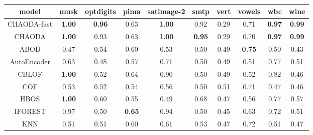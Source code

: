 \begin{table*}[!t]
\begin{center}
\begin{small}
\begin{sc}
\begin{tabular}{|c|c|c|c|c|c|c|c|c|c|}
\hline
\textbf{model} & \textbf{musk} & \textbf{optdigits} & \textbf{pima} & \textbf{satimage-2} & \textbf{smtp} & \textbf{vert} & \textbf{vowels} &  \textbf{wbc} & \textbf{wine} \\
\hline
        CHAODA-fast & \textbf{1.00} &      \textbf{0.96} &          0.63 &       \textbf{1.00} &          0.92 &               0.29 &            0.71 & \textbf{0.97} & \textbf{0.99} \\
\hline
        CHAODA & \textbf{1.00} &               0.93 &          0.63 &       \textbf{1.00} & \textbf{0.95} &               0.29 &            0.70 & \textbf{0.97} & \textbf{0.99} \\
\hline
                ABOD &          0.47 &               0.54 &          0.60 &                0.53 &          0.50 &               0.49 &   \textbf{0.75} &          0.50 &          0.43 \\
\hline
        AutoEncoder &          0.63 &               0.48 &          0.57 &                0.71 &          0.50 &               0.49 &            0.51 &          0.77 &          0.51 \\
\hline
                CBLOF & \textbf{1.00} &               0.52 &          0.64 &                0.90 &          0.50 &               0.49 &            0.52 &          0.82 &          0.46 \\
\hline
                COF &          0.53 &               0.52 &          0.54 &                0.56 &          0.50 &               0.51 &            0.71 &          0.47 &          0.46 \\
\hline
                HBOS & \textbf{1.00} &               0.60 &          0.55 &                0.49 &          0.68 &               0.47 &            0.56 &          0.77 &          0.57 \\
\hline
        IFOREST &          0.97 &               0.50 & \textbf{0.65} &                0.94 &          0.50 &               0.45 &            0.63 &          0.72 &          0.51 \\
\hline
                KNN &          0.51 &               0.51 &          0.60 &                0.61 &          0.53 &               0.47 &            0.72 &          0.51 &          0.47 \\

\end{tabular}
\end{sc}
\end{small}
\end{center}
\end{table*}
